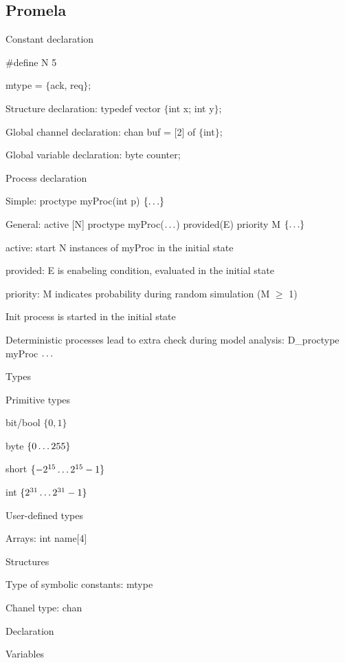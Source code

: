 \subsection{Promela}
\enumstart
	\item Constant declaration
	\enumstart
		\item \#define N 5
		\item mtype = $\{$ack, req$\}$;
	\enumend
	\item Structure declaration: typedef vector $\{$int x; int y$\}$;
	\item Global channel declaration: chan buf = [2] of $\{$int$\}$;
	\item Global variable declaration: byte counter;
	\item Process declaration
	\enumstart
		\item Simple: proctype myProc(int p) $\{\mathellipsis\}$
		\item General: active [N] proctype myProc($\mathellipsis$) provided(E) priority M $\{\mathellipsis\}$
		\enumstart
			\item active: start N instances of myProc in the initial state
			\item provided: E is enabeling condition, evaluated in the initial state
			\item priority: M indicates probability during random simulation (M $\ge$ 1)
		\enumend
		\item Init process is started in the initial state
		\item Deterministic processes lead to extra check during model analysis: D\_proctype myProc $\mathellipsis$
	\enumend
	\item Types
	\enumstart
		\item Primitive types
		\enumstart
			\item bit/bool $\{0,1\}$
			\item byte $\{0\mathellipsis255\}$
			\item short $\{-2^{15}\mathellipsis2^{15}-1\}$
			\item int $\{2^{31}\mathellipsis2^{31}-1\}$
		\enumend
		\item User-defined types
		\enumstart
			\item Arrays: int name[4]
			\item Structures
			\item Type of symbolic constants: mtype
		\enumend
		\item Chanel type: chan
		\item Declaration
		\enumstart
			\item Variables
